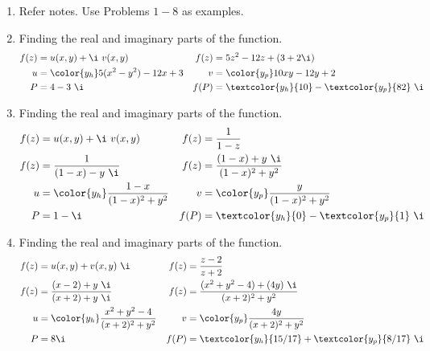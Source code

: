 \begin{enumerate}
    \item Refer notes. Use Problems $ 1-8 $ as examples.

    \item Finding the real and imaginary parts of the function.
          \begin{align}
              f(z) & = u(x, y) + \i\ v(x, y)                         &
              f(z) & = 5z^2 - 12z + (3 + 2\i)                          \\
              u    & = \color{y_h} 5(x^2 - y^2) - 12x + 3            &
              v    & = \color{y_p} 10xy - 12y + 2                      \\
              P    & = 4 - 3\ \i                                     &
              f(P) & = \textcolor{y_h}{10} - \textcolor{y_p}{82}\ \i
          \end{align}

    \item Finding the real and imaginary parts of the function.
          \begin{align}
              f(z) & = u(x, y) + \i\ v(x, y)                       &
              f(z) & = \frac{1}{1-z}                                 \\
              f(z) & = \frac{1}{(1-x) - y\ \i}                     &
              f(z) & = \frac{(1-x) + y\ \i}{(1-x)^2 + y^2}           \\
              u    & = \color{y_h} \frac{1-x}{(1-x)^2 + y^2}       &
              v    & = \color{y_p} \frac{y}{(1-x)^2 + y^2}           \\
              P    & = 1 - \i                                      &
              f(P) & = \textcolor{y_h}{0} - \textcolor{y_p}{1}\ \i
          \end{align}

    \item Finding the real and imaginary parts of the function.
          \begin{align}
              f(z) & = u(x, y) + v(x, y)\ \i                            &
              f(z) & = \frac{z-2}{z+2}                                    \\
              f(z) & = \frac{(x-2) + y\ \i}{(x+2) + y\ \i}              &
              f(z) & = \frac{(x^2 + y^2 - 4) + (4y)\ \i}{(x+2)^2 + y^2}   \\
              u    & = \color{y_h} \frac{x^2 + y^2 - 4}{(x+2)^2 + y^2}  &
              v    & = \color{y_p} \frac{4y}{(x+2)^2 + y^2}               \\
              P    & = 8\i                                              &
              f(P) & = \textcolor{y_h}{15/17} + \textcolor{y_p}
              {8/17}\ \i
          \end{align}


\end{enumerate}
